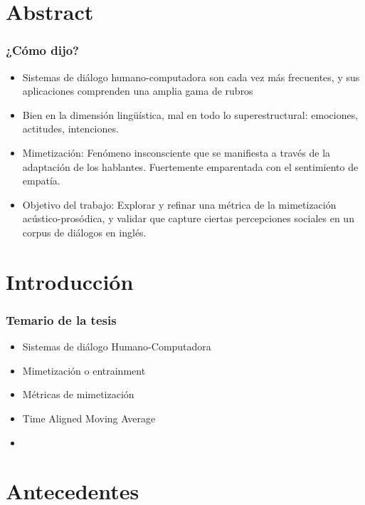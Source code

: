 \documentclass{beamer}
\title{\tituloTesis}
\author{Juan Manuel Pérez}
\begin{document}
\frame{\titlepage}


\section{Abstract}

\begin{frame}
  \frametitle{¿Cómo dijo?}


\begin{itemize}[<+->]
  \item Sistemas de diálogo humano-computadora son cada vez más frecuentes, y sus aplicaciones comprenden una amplia gama de rubros
  \item Bien en la dimensión lingüística, mal en todo lo superestructural: emociones, actitudes, intenciones.
  \item Mimetización: Fenómeno insconsciente que se manifiesta a través de la adaptación de los hablantes. Fuertemente emparentada con el sentimiento de empatía.
  \item Objetivo del trabajo: Explorar y refinar una métrica de la mimetización acústico-prosódica, y validar que capture ciertas percepciones sociales en un corpus de diálogos en inglés.
\end{itemize}

\end{frame}


\section{Introducción}

\begin{frame}
  \frametitle{Temario de la tesis}
  \centering{}
  \begin{itemize}
    \item Sistemas de diálogo Humano-Computadora
    \item Mimetización o entrainment
    \item Métricas de mimetización
    \item Time Aligned Moving Average
    \item
  \end{itemize}

\end{frame}




\section{Antecedentes}
\end{document}
